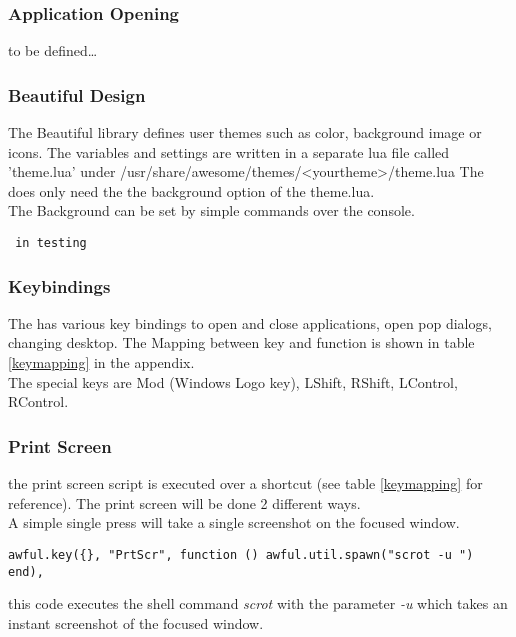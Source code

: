 			\subsubsection{Application Opening}
				to be defined\ldots
				
			\subsubsection{Beautiful Design}
				The Beautiful library defines user themes such as color, background image or icons. The variables and settings are written in a separate lua file called 'theme.lua' under /usr/share/awesome/themes/<yourtheme>/theme.lua The \project does only need the the background option of the theme.lua.\\
				The Background can be set by simple commands over the console.
				\begin{lstlisting}
 in testing
				\end{lstlisting}			
				
			\subsubsection{Keybindings}
				The \project has various key bindings to open and close applications, open pop dialogs, changing desktop. The Mapping between key and function is shown in table \ref{keymapping} in the appendix.\\
				The special keys are Mod (Windows Logo key), LShift, RShift, LControl, RControl.
				
			\subsubsection{Print Screen}
				the print screen script is executed over a shortcut (see table \ref{keymapping} for reference). The print screen will be done 2 different ways.\\
				A simple single press will take a single screenshot on the focused window.\\
				
				\begin{lstlisting}[caption={print screen command}]
awful.key({}, "PrtScr", function () awful.util.spawn("scrot -u ") end),
				\end{lstlisting}
				this code executes the shell command \textit{scrot} with the parameter \textit{-u} which takes an instant screenshot of the focused window.
			

